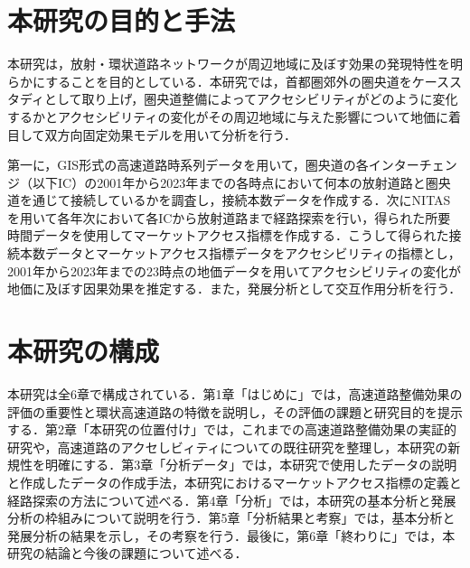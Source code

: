 \section{本研究の目的と手法}

本研究は，放射・環状道路ネットワークが周辺地域に及ぼす効果の発現特性を明らかにすることを目的としている．本研究では，首都圏郊外の圏央道をケーススタディとして取り上げ，圏央道整備によってアクセシビリティがどのように変化するかとアクセシビリティの変化がその周辺地域に与えた影響について地価に着目して双方向固定効果モデルを用いて分析を行う．

第一に，GIS形式の高速道路時系列データを用いて，圏央道の各インターチェンジ（以下IC）の2001年から2023年までの各時点において何本の放射道路と圏央道を通じて接続しているかを調査し，接続本数データを作成する．次にNITASを用いて各年次において各ICから放射道路まで経路探索を行い，得られた所要時間データを使用してマーケットアクセス指標を作成する．こうして得られた接続本数データとマーケットアクセス指標データをアクセシビリティの指標とし，2001年から2023年までの23時点の地価データを用いてアクセシビリティの変化が地価に及ぼす因果効果を推定する．また，発展分析として交互作用分析を行う．

\section{本研究の構成}

本研究は全6章で構成されている．第1章「はじめに」では，高速道路整備効果の評価の重要性と環状高速道路の特徴を説明し，その評価の課題と研究目的を提示する．第2章「本研究の位置付け」では，これまでの高速道路整備効果の実証的研究や，高速道路のアクセしビィティについての既往研究を整理し，本研究の新規性を明確にする．第3章「分析データ」では，本研究で使用したデータの説明と作成したデータの作成手法，本研究におけるマーケットアクセス指標の定義と経路探索の方法について述べる．第4章「分析」では，本研究の基本分析と発展分析の枠組みについて説明を行う．第5章「分析結果と考察」では，基本分析と発展分析の結果を示し，その考察を行う．最後に，第6章「終わりに」では，本研究の結論と今後の課題について述べる．

